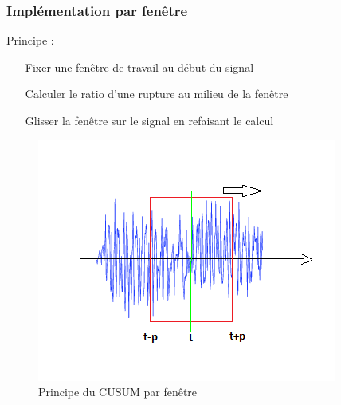 \documentclass{beamer}
\begin{document}
\begin{frame}

\frametitle{Implémentation par fenêtre}
Principe : %

\begin{itemize}
	\item[Fixer] une fenêtre de travail au début du signal
	\item[Calculer] le ratio d'une rupture au milieu de la fenêtre
	\item[Glisser] la fenêtre sur le signal en refaisant le calcul
\end{itemize}

\begin{figure}
	\includegraphics[scale=0.5]{diagramme_cusum_fen.png}
	\caption{Principe du CUSUM par fenêtre}
\end{figure}



\end{frame}
\end{document}
